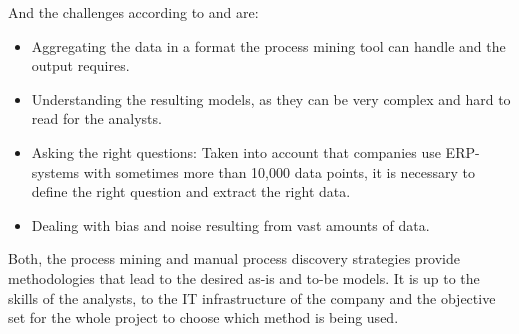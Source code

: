 And the challenges according to \cite{manifesto2011} and \cite{Dumas2013} are:
\begin{itemize}
\item Aggregating the data in a format the process mining tool can handle and the output requires. 
\item Understanding the resulting models, as they can be very complex and hard to read for the analysts.
\item Asking the right questions: Taken into account that companies use ERP-systems with sometimes more than 10,000 data points, it is necessary to define the right question and extract the right data. 
\item Dealing with bias and noise resulting from vast amounts of data. 
\end{itemize}

Both, the process mining and manual process discovery strategies provide methodologies that lead to the desired as-is and to-be models. It is up to the skills of the analysts, to the IT infrastructure of the company and the objective set for the whole project to choose which method is being used. 

